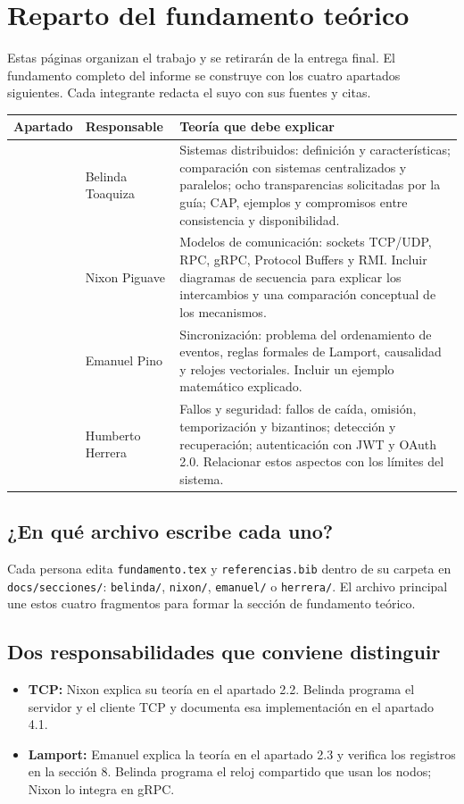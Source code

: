 \section*{Reparto del fundamento teórico}
Estas páginas organizan el trabajo y se retirarán de la entrega final.
El fundamento completo del informe se construye con los cuatro apartados siguientes.
Cada integrante redacta el suyo con sus fuentes y citas.

\begingroup
\small
\renewcommand{\arraystretch}{1.3}
\noindent\begin{tabular}{@{}>{\raggedright\arraybackslash}p{1.6cm}>{\raggedright\arraybackslash}p{2.9cm}>{\raggedright\arraybackslash}p{10.5cm}@{}}
\toprule
Apartado & Responsable & Teoría que debe explicar \\
\midrule
2.1 & Belinda Toaquiza & Sistemas distribuidos: definición y características;
comparación con sistemas centralizados y paralelos; ocho transparencias solicitadas
por la guía; CAP, ejemplos y compromisos entre consistencia y disponibilidad. \\
2.2 & Nixon Piguave & Modelos de comunicación: sockets TCP/UDP, RPC, gRPC,
Protocol Buffers y RMI. Incluir diagramas de secuencia para explicar los intercambios
y una comparación conceptual de los mecanismos. \\
2.3 & Emanuel Pino & Sincronización: problema del ordenamiento de eventos,
reglas formales de Lamport, causalidad y relojes vectoriales. Incluir un ejemplo
matemático explicado. \\
2.4 & Humberto Herrera & Fallos y seguridad: fallos de caída, omisión,
temporización y bizantinos; detección y recuperación; autenticación con JWT y
OAuth 2.0. Relacionar estos aspectos con los límites del sistema. \\
\bottomrule
\end{tabular}
\endgroup

\subsection*{¿En qué archivo escribe cada uno?}
Cada persona edita \texttt{fundamento.tex} y \texttt{referencias.bib} dentro de su
carpeta en \texttt{docs/secciones/}: \texttt{belinda/}, \texttt{nixon/},
\texttt{emanuel/} o \texttt{herrera/}. El archivo principal une estos cuatro
fragmentos para formar la sección de fundamento teórico.

\subsection*{Dos responsabilidades que conviene distinguir}
\begin{itemize}
    \item \textbf{TCP:} Nixon explica su teoría en el apartado 2.2.
    Belinda programa el servidor y el cliente TCP y documenta esa implementación
    en el apartado 4.1.
    \item \textbf{Lamport:} Emanuel explica la teoría en el apartado 2.3 y verifica
    los registros en la sección 8. Belinda programa el reloj compartido que usan
    los nodos; Nixon lo integra en gRPC.
\end{itemize}

